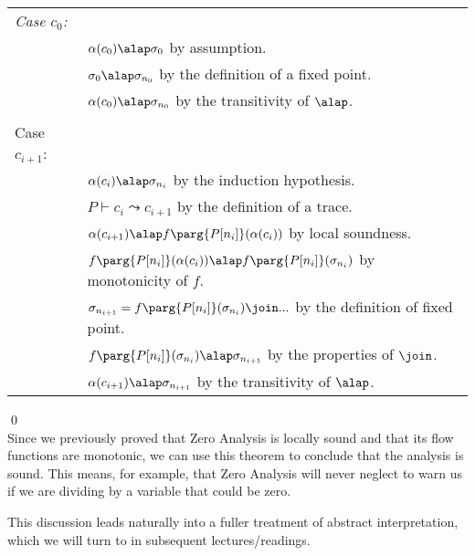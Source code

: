 \documentclass[11pt]{article}
\begin{document}
\begin{tabular}{ll}
\emph{Case $c_0$:} & \\
& $\alpha(c_0) \alap \sigma_0$ by assumption. \\
& $\sigma_0 \alap \sigma_{n_0}$ by the definition of a fixed point. \\
& $\alpha(c_0) \alap \sigma_{n_0}$ by the transitivity of $\alap$.\\

\\

Case $c_{i+1}$: & \\
& $\alpha(c_i) \alap \sigma_{n_i}$ by the induction hypothesis. \\
& $P \vdash c_i \leadsto c_{i+1}$ by the definition of a trace. \\
& $\alpha(c_{i+1}) \alap f\parg{P[n_i]}(\alpha(c_i))$ by local soundness. \\
& $f\parg{P[n_i]}(\alpha(c_i)) \alap f\parg{P[n_i]}(\sigma_{n_i})$ by monotonicity of $f$. \\
& $\sigma_{n_{i+1}} = f\parg{P[n_i]}(\sigma_{n_i}) \join ...$ by the definition of fixed point. \\
& $f\parg{P[n_i]}(\sigma_{n_i}) \alap \sigma_{n_{i+1}}$ by the properties of $\join$. \\
& $\alpha(c_{i+1}) \alap \sigma_{n_{i+1}}$ by the transitivity of $\alap$. \\
\end{tabular}

\qed\\[1ex]

Since we previously proved that Zero Analysis is locally sound and that its flow functions are monotonic, we can use this theorem to conclude that the analysis is sound.  This means, for example, that Zero Analysis will never neglect to warn us if we are dividing by a variable that could be zero.

\vspace{1ex}

This discussion leads naturally into a fuller treatment of abstract interpretation, which we will turn to in subsequent lectures/readings.
\end{document}
